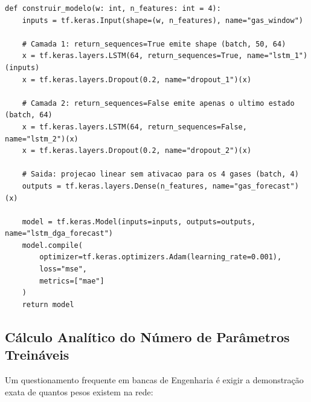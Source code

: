 \documentclass[11pt,a4paper]{article}
\begin{document}
\begin{lstlisting}
def construir_modelo(w: int, n_features: int = 4):
    inputs = tf.keras.Input(shape=(w, n_features), name="gas_window")

    # Camada 1: return_sequences=True emite shape (batch, 50, 64)
    x = tf.keras.layers.LSTM(64, return_sequences=True, name="lstm_1")(inputs)
    x = tf.keras.layers.Dropout(0.2, name="dropout_1")(x)

    # Camada 2: return_sequences=False emite apenas o ultimo estado (batch, 64)
    x = tf.keras.layers.LSTM(64, return_sequences=False, name="lstm_2")(x)
    x = tf.keras.layers.Dropout(0.2, name="dropout_2")(x)

    # Saida: projecao linear sem ativacao para os 4 gases (batch, 4)
    outputs = tf.keras.layers.Dense(n_features, name="gas_forecast")(x)

    model = tf.keras.Model(inputs=inputs, outputs=outputs, name="lstm_dga_forecast")
    model.compile(
        optimizer=tf.keras.optimizers.Adam(learning_rate=0.001),
        loss="mse",
        metrics=["mae"]
    )
    return model
\end{lstlisting}

\subsection{Cálculo Analítico do Número de Parâmetros Treináveis}
Um questionamento frequente em bancas de Engenharia é exigir a demonstração exata de quantos pesos existem na rede:
\end{document}
